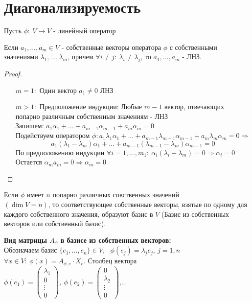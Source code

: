 \section{Диагонализируемость}
    Пусть $\phi: \ V \to V$ - линейный оператор
    \begin{lemma}
        Если $a_1,...,a_m \in V$ - собственные векторы оператора $\phi$ с собственными значениями $\lambda_1,...,\lambda_m$, причем $\forall i \neq j: \ \lambda_i \neq \lambda_j$, то $a_1,...,a_m$ - ЛНЗ.    
    \end{lemma}
    \begin{proof} \tab
        \begin{itemize}
            \item[$m=1:$] Один вектор $a_1 \neq 0$ ЛНЗ
            \item[$m>1:$]  Предположение индукции: Любые $m-1$ вектор, отвечающих попарно различным собственным значениям - ЛНЗ\\
            Запишем: $a_1\alpha_1 + ... + a_{m-1}\alpha_{m-1} + a_m \alpha_m = 0$ \\
            Подействуем оператором $\phi: a_1 \lambda_1\alpha_1 + ... + a_{m-1} \lambda_{m-1}\alpha_{m-1} + a_m  \lambda_m\alpha_m = 0 \Longrightarrow$
            $$a_1 (\lambda_1 - \lambda_m)\alpha_1 + ... + a_{m-1} (\lambda_{m-1} - \lambda_m)\alpha_{m-1} = 0$$ 
            По предположению индукции $\forall i = 1,...,m_1: \ \alpha_i(\lambda_i - \lambda_m)= 0 \Longrightarrow \alpha_i = 0$\\
            Остается $\alpha_ma_m = 0 \Longrightarrow \alpha_m = 0$ 
        \end{itemize}
    \end{proof}
    \begin{consequense}
        Если $\phi$ имеет $n$ попарно различных совственных значений\\ $(\dim V = n)$, то соответствующее собственные векторы, взятые по одному для каждого собственного значения, образуют базис в $V$ (Базис из собственных векторов или собственный базис).
    \end{consequense}
    \textbf{Вид матрицы $A_\phi$ в базисе из собственных векторов:}\\
    Обозначаем базис $\{e_1,...,e_n\} \in V$, \ $\phi(e_j) = \lambda_j e_j, \ j = \overline{1,n}$  \\
    $\forall x \in V: \ \phi(x) = A_{\phi,e}\cdot X_e$. Столбец вектора $\phi(e_1) = \left(\begin{smallmatrix}
        \lambda_1 \\ 0 \\ \vdots \\ 0
    \end{smallmatrix}\right), \ \phi(e_2) = \left(\begin{smallmatrix}
        0 \\ \lambda_2 \\ \vdots \\ 0
    \end{smallmatrix}\right)$,...
